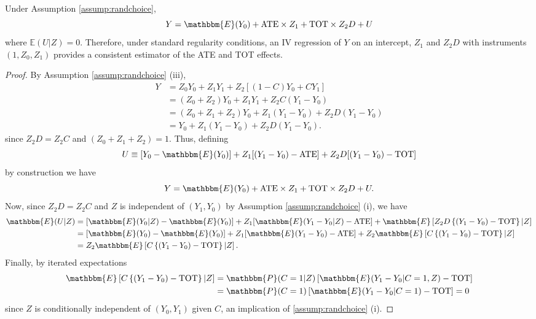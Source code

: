 \begin{prop} 
\label{prop:TOTreg}
Under Assumption \ref{assump:randchoice},
\[
Y = \mathbbm{E}(Y_0) + \text{ATE}\times Z_1 + \text{TOT} \times Z_2 D + U
\]
where $\mathbb{E}(U|Z) = 0$.
Therefore, under standard regularity conditions, an IV regression of $Y$ on an intercept, $Z_1$ and $Z_2 D$ with instruments $(1, Z_0, Z_1)$ provides a consistent estimator of the ATE and TOT effects.
\end{prop}

\begin{proof}
By Assumption \ref{assump:randchoice} (iii),
\begin{align*}
Y &= Z_0 Y_0 + Z_1 Y_1 + Z_2[(1 - C) Y_0 + CY_1]\\
&= (Z_0 + Z_2)Y_0 + Z_1 Y_1 + Z_2C(Y_1 - Y_0)\\
&= (Z_0 + Z_1 + Z_2)Y_0 + Z_1 (Y_1 - Y_0) + Z_2D(Y_1 - Y_0)\\
&= Y_0 + Z_1 (Y_1 - Y_0) + Z_2D(Y_1 - Y_0).
\end{align*}
since $Z_2 D = Z_2 C$ and $(Z_0 + Z_1 + Z_2) = 1$.
Thus, defining 
\[
U \equiv [Y_0 - \mathbbm{E}(Y_0)] + Z_1[(Y_1 - Y_0) - \text{ATE}] + Z_2 D[(Y_1 - Y_0) - \text{TOT}]
\]
by construction we have
\[
Y = \mathbbm{E}(Y_0) + \text{ATE} \times Z_1 + \text{TOT} \times Z_2 D+ U.
\]
Now, since $Z_2 D = Z_2 C$ and $Z$ is independent of $(Y_1, Y_0)$ by Assumption \ref{assump:randchoice} (i), we have
\begin{align*}
\mathbbm{E}(U|Z) &= [\mathbbm{E}(Y_0|Z) - \mathbbm{E}(Y_0)]  + Z_1[\mathbbm{E}(Y_1 - Y_0|Z) - \text{ATE}] +  \mathbbm{E}\left[Z_2 D\left\{(Y_1 - Y_0) - \text{TOT}\right\}|Z\right]\\
&= [\mathbbm{E}(Y_0) - \mathbbm{E}(Y_0)]  + Z_1[\mathbbm{E}(Y_1 - Y_0) - \text{ATE}] + Z_2 \mathbbm{E}\left[C\left\{(Y_1 - Y_0) - \text{TOT}\right\}|Z\right]\\
&= Z_2 \mathbbm{E}\left[C\left\{(Y_1 - Y_0) - \text{TOT}\right\}|Z\right].
\end{align*}
Finally, by iterated expectations
\begin{align*}
\mathbbm{E}\left[C\left\{(Y_1 - Y_0) - \text{TOT}\right\}|Z\right] &=  \mathbbm{P}(C=1|Z) \left[\mathbbm{E}(Y_1 - Y_0|C=1,Z)  - \text{TOT}\right]\\
&= \mathbbm{P}(C=1)\left[\mathbbm{E}(Y_1 - Y_0|C=1) - \text{TOT} \right]=0
\end{align*}
since $Z$ is conditionally independent of $(Y_0, Y_1)$ given $C$, an implication of \ref{assump:randchoice} (i).
\end{proof}

